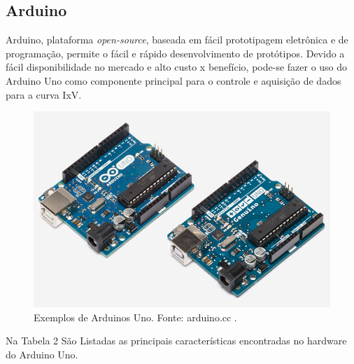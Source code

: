 \subsection{Arduino}
Arduino, plataforma \textit{open-source}, baseada em fácil prototipagem eletrônica e de programação, permite o fácil e rápido desenvolvimento de protótipos. Devido a fácil disponibilidade no mercado e alto custo x benefício, pode-se fazer o uso do Arduino Uno como componente principal para o controle e aquisição de dados para a curva IxV.

\FloatBarrier
\begin{figure}[!htbp]
	\centering
	\includegraphics[scale=0.7]{imagens/Uno}
	\caption{Exemplos de Arduinos Uno. Fonte: arduino.cc . }
	
	\label{fig:ArduinoUno}
\end{figure}
\FloatBarrier

Na Tabela 2 São Listadas as principais características encontradas no hardware do Arduino Uno.

